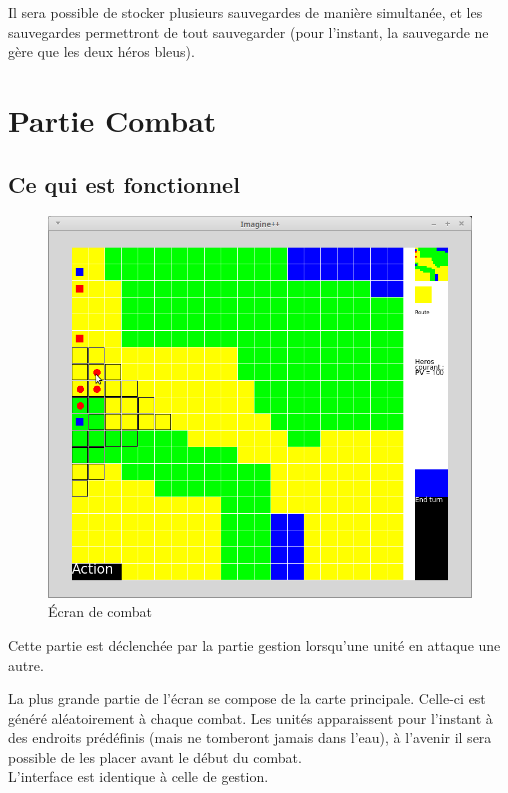 \documentclass[11pt,a4paper]{article}
\begin{document}
Il sera possible de stocker plusieurs sauvegardes de manière simultanée, et les sauvegardes permettront de tout sauvegarder (pour l'instant, la sauvegarde ne gère que les deux héros bleus).


\section{Partie Combat}

\subsection{Ce qui est fonctionnel}

\begin{figure}[h]
\begin{center}
\includegraphics[scale=0.5]{./ecran_de_combat.png}
\caption{Écran de combat}
\end{center}
\end{figure}


Cette partie est déclenchée par la partie gestion lorsqu'une unité en attaque une autre.

La plus grande partie de l'écran se compose de la carte principale. Celle-ci est généré aléatoirement à chaque combat. Les unités apparaissent pour l'instant à des endroits prédéfinis (mais ne tomberont jamais dans l'eau), à l'avenir il sera possible de les placer avant le début du combat. \\
L'interface est identique à celle de gestion. \\
\end{document}
